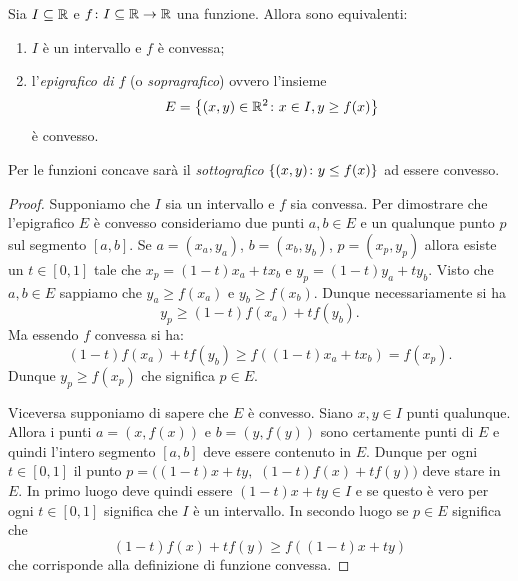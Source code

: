 \begin{theorem}
Sia $I\subseteq {\mathbb R}$ e $f\colon I\subseteq {\mathbb R}\to {\mathbb R}$ una funzione.
Allora sono equivalenti:
\begin{enumerate}
\item $I$ è un intervallo e $f$ è convessa;
\item l'\emph{epigrafico di $f$}%
%
 (o \emph{sopragrafico})
ovvero l'insieme
\[
  E = {\left\{ (x,y)\in {\mathbb R}^2\colon x\in I, y\ge f(x) \right\}}
\]
è convesso.
\end{enumerate}

Per le funzioni concave sarà il \emph{sottografico} ${\left\{ (x,y)\colon y\le f(x) \right\}}$ ad essere convesso.
\end{theorem}
%
\begin{proof}
Supponiamo che $I$ sia un intervallo e $f$ sia convessa. Per dimostrare che l'epigrafico $E$ è convesso consideriamo due punti $a,b\in E$ e un qualunque punto $p$ sul segmento $[a,b]$.
Se $a=(x_a, y_a)$, $b=(x_b,y_b)$, $p=(x_p, y_p)$
allora esiste un $t\in [0,1]$ tale che $x_p = (1-t)x_a + t x_b$ e $y_p=(1-t)y_a + t y_b$.
Visto che $a,b\in E$ sappiamo che $y_a \ge f(x_a)$ e $y_b\ge f(x_b)$. Dunque necessariamente si ha
\[
  y_p \ge (1-t)f(x_a) + t f(y_b).
\]
Ma essendo $f$ convessa si ha:
\[
  (1-t)f(x_a) + t f(y_b) \ge f((1-t)x_a + t x_b) = f(x_p).
\]
Dunque $y_p\ge f(x_p)$ che significa $p\in E$.

Viceversa supponiamo di sapere che $E$ è convesso. Siano $x,y\in I$ punti qualunque. Allora i punti $a=(x,f(x))$ e $b=(y,f(y))$ sono certamente punti di $E$ e quindi l'intero segmento $[a,b]$ deve essere contenuto in $E$. Dunque per ogni $t\in [0,1]$ il punto $p = ((1-t)x + t y,$ $(1-t)f(x)+ tf(y))$ deve stare in $E$. In primo luogo deve quindi essere $(1-t)x+ty\in I$ e se questo è vero per ogni $t\in[0,1]$ significa che $I$ è un intervallo. In secondo luogo se $p\in E$ significa che
\[
  (1-t)f(x) +t f(y) \ge f((1-t)x + t y)
\]
che corrisponde alla definizione di funzione convessa.
\end{proof}


